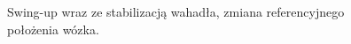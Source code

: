 \begin{figure}[H]
	\caption{Swing-up wraz ze stabilizacją wahadła, zmiana referencyjnego położenia wózka.}
\label{fig:Swing2}
\end{figure}
